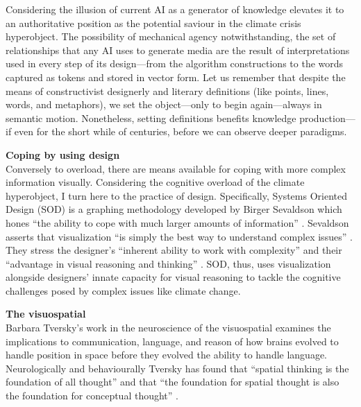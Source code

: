 Considering the illusion of current AI as a generator of knowledge elevates it to an authoritative position as the potential saviour in the climate crisis hyperobject. The possibility of mechanical agency notwithstanding, the set of relationships that any AI uses to generate media are the result of interpretations used in every step of its design—from the algorithm constructions to the words captured as tokens and stored in vector form. Let us remember that despite the means of constructivist designerly and literary definitions (like points, lines, words, and metaphors), we set the object—only to begin again—always in semantic motion. Nonetheless, setting definitions benefits knowledge production—if even for the short while of centuries, before we can observe deeper paradigms.

\noindent \textbf{Coping by using design} \\
Conversely to overload, there are means available for coping with more complex information visually. Considering the cognitive overload of the climate hyperobject, I turn here to the practice of design. Specifically, Systems Oriented Design (SOD) is a graphing methodology developed by Birger Sevaldson which hones ``the ability to cope with much larger amounts of information” \citep[p. 34]{sevaldson_designing_2022}. Sevaldson asserts that visualization ``is simply the best way to understand complex issues” \citep[p. 34]{sevaldson_designing_2022}. They stress the designer’s ``inherent ability to work with complexity” and their ``advantage in visual reasoning and thinking” \citep[p. 34]{sevaldson_designing_2022}. SOD, thus, uses visualization alongside designers’ innate capacity for visual reasoning to tackle the cognitive challenges posed by complex issues like climate change.

\noindent \textbf{The visuospatial} \\
Barbara Tversky’s work in the neuroscience of the visuospatial examines the implications to communication, language, and reason of how brains evolved to handle position in space before they evolved the ability to handle language. Neurologically and behaviourally Tversky has found that ``spatial thinking is the foundation of all thought” and that “the foundation for spatial thought is also the foundation for conceptual thought” \citep{tversky_barbara_2022}.


